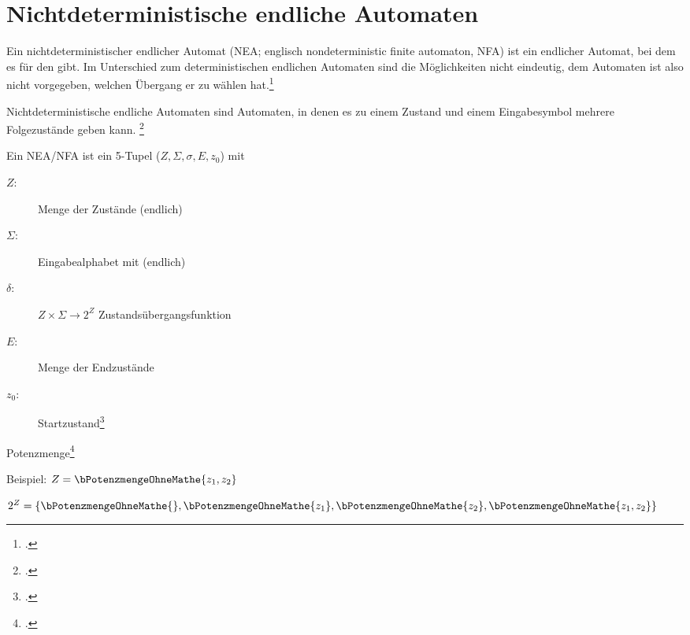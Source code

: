 \documentclass{bschlangaul-theorie}
\begin{document}
%

\section{Nichtdeterministische endliche Automaten}

Ein nichtdeterministischer endlicher Automat (NEA; englisch
nondeterministic finite automaton, NFA) ist ein endlicher Automat, bei
dem es für den  gibt. Im Unterschied zum deterministischen endlichen
Automaten sind die Möglichkeiten nicht eindeutig, dem Automaten ist also
nicht vorgegeben, welchen Übergang er zu wählen hat.\footcite{wiki:nfa}

\begin{center}
\end{center}

Nichtdeterministische endliche Automaten sind Automaten, in denen es zu
einem Zustand und einem Eingabesymbol mehrere Folgezustände geben kann.
\footcite[Seite 28]{vossen}

Ein NEA/NFA ist ein 5-Tupel ($Z, \Sigma, \sigma, E, z_0$) mit

\begin{description}
\item[$Z$:] Menge der Zustände (endlich)
\item[$\Sigma$:] Eingabealphabet mit (endlich)
\item[$\delta$:] $Z \times \Sigma \rightarrow 2^Z$ Zustandsübergangsfunktion
\item[$E$:] Menge der Endzustände
\item[$z_0$:] Startzustand\footcite[Seite 30]{theo:fs:1}
\end{description}

Potenzmenge\footcite{wiki:potenzmenge}

\let\p=\bPotenzmengeOhneMathe

Beispiel: $Z = \p{ z_1, z_2 }$

$2^Z = \{\p{}, \p{z_1 }, \p{z_2 }, \p{z_1 , z_2 }\}$
\end{document}
